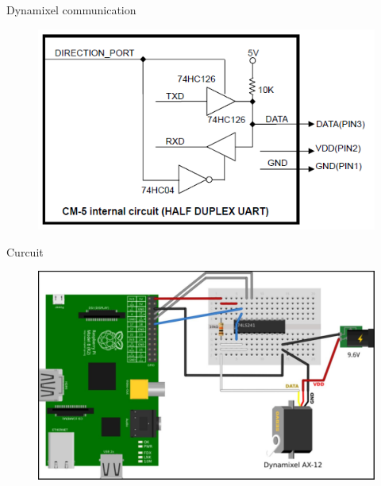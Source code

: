 \documentclass{beamer}
\begin{document}
\begin{frame}{Dynamixel communication}

    \begin{figure}
        \centering
        \includegraphics[width = \textwidth]{img/ttl_circuit.png}
        
    \end{figure}
    
\end{frame}



\begin{frame}{Curcuit}

    \begin{figure}
        \centering
        \includegraphics[width = \textwidth]{img/curcuit.jpg}
        
    \end{figure}
    
\end{frame}
\end{document}
